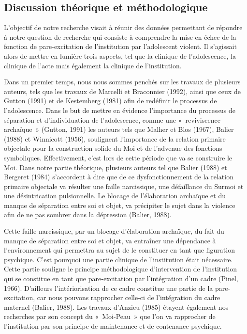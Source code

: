 \documentclass[12pt, a4paper]{book}
\begin{document}
\begin{spacing}{1.5}
\section{Discussion théorique et méthodologique}

L'objectif de notre recherche visait à réunir des données permettant de répondre à notre question de recherche qui consiste à comprendre la mise en échec de la fonction de pare-excitation de l'institution par l'adolescent violent. Il s'agissait alors de mettre en lumière trois aspects, tel que la clinique de l'adolescence, la clinique de l'acte mais également la clinique de l'institution.

Dans un premier temps, nous nous sommes penchés sur les travaux de plusieurs auteurs, tels que les travaux de Marcelli et Braconnier (1992), ainsi que ceux de Gutton (1991) et de Kestemberg (1981) afin de redéfinir le processus de l'adolescence. Dans le but de mettre en évidence l'importance du processus de séparation et d'individuation de l'adolescence, comme une « reviviscence archaïque » (Gutton, 1991) les auteurs tels que Malher et Blos (1967), Balier (1988) et Winnicott (1956), soulignent l'importance de la relation primaire objectale pour la construction solide du Moi et de l'advenue des fonctions symboliques. Effectivement, c'est lors de cette période que va se construire le Moi. Dans notre partie théorique, plusieurs auteurs tel que Balier (1988) et Bergeret (1984) s'accordent à dire que de ce dysfonctionnement de la relation primaire objectale  va résulter  une faille narcissique,  une défaillance du Surmoi et  une désintrication pulsionnelle. Le blocage de l'élaboration archaïque et du manque de séparation entre soi et objet, va précipiter le sujet dans la violence afin de ne pas sombrer dans la dépression (Balier, 1988).

Cette faille narcissique, par un blocage d'élaboration archaïque, du fait du manque de séparation entre soi et objet, va entraîner une dépendance à l'environnement qui permettra au sujet de le constituer en tant que figuration psychique.  C'est pourquoi une partie clinique de l'institution était nécessaire. Cette partie souligne le principe méthodologique d'intervention de l'institution qui se constitue en tant que pare-excitation par l'intégration d'un cadre (Pinel, 1966). D'ailleurs l'intériorisation de ce cadre constitue une partie de la pare-excitation, car nous pouvons rapprocher celle-ci de l'intégration du cadre maternel (Balier, 1988). Les travaux d'Anzieu (1985) étayent également nos recherches par son concept du « Moi-Peau » que l'on va rapprocher de l'institution par son principe de maintenance et de contenance psychique.


\end{spacing}
\end{document}
